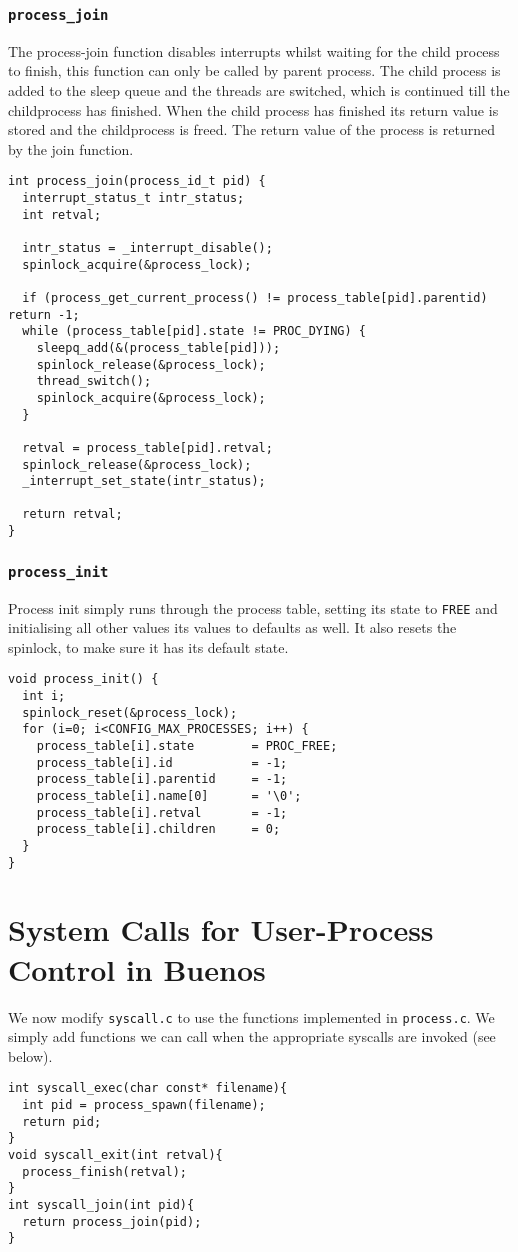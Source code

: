 \documentclass[a4paper,12pt]{article}
\begin{document}
\subsubsection{\texttt{process\_join}}
The process-join function disables interrupts whilst waiting for the child process to finish, this function can only be called by parent process. The child process is added to the sleep queue and the threads are switched, which is continued till the childprocess has finished. When the child process has finished its return value is stored and the childprocess is freed. The return value of the process is returned by the join function.

\begin{lstlisting}
int process_join(process_id_t pid) {
  interrupt_status_t intr_status;
  int retval;

  intr_status = _interrupt_disable();
  spinlock_acquire(&process_lock);

  if (process_get_current_process() != process_table[pid].parentid) return -1;
  while (process_table[pid].state != PROC_DYING) {
    sleepq_add(&(process_table[pid]));
    spinlock_release(&process_lock);
    thread_switch();
    spinlock_acquire(&process_lock);
  }

  retval = process_table[pid].retval;
  spinlock_release(&process_lock);
  _interrupt_set_state(intr_status);

  return retval;
} 
\end{lstlisting}

\subsubsection{\texttt{process\_init}}
Process init simply runs through the process table, setting its state to \texttt{FREE} and initialising all other values its values to defaults as well. It also resets the spinlock, to make sure it has its default state.
\begin{lstlisting}
void process_init() {
  int i;
  spinlock_reset(&process_lock);
  for (i=0; i<CONFIG_MAX_PROCESSES; i++) {
    process_table[i].state        = PROC_FREE;
    process_table[i].id           = -1;
    process_table[i].parentid     = -1;
    process_table[i].name[0]      = '\0'; 
    process_table[i].retval       = -1;
    process_table[i].children     = 0;
  }
}
\end{lstlisting}

\section{System Calls for User-Process Control in Buenos}
We now modify \texttt{syscall.c} to use the functions implemented in \texttt{process.c}. We simply add functions we can call when the appropriate syscalls are invoked (see below).
\begin{lstlisting}
int syscall_exec(char const* filename){
  int pid = process_spawn(filename);
  return pid;
}
void syscall_exit(int retval){
  process_finish(retval);
}
int syscall_join(int pid){
  return process_join(pid);
}
\end{lstlisting}
\end{document}
